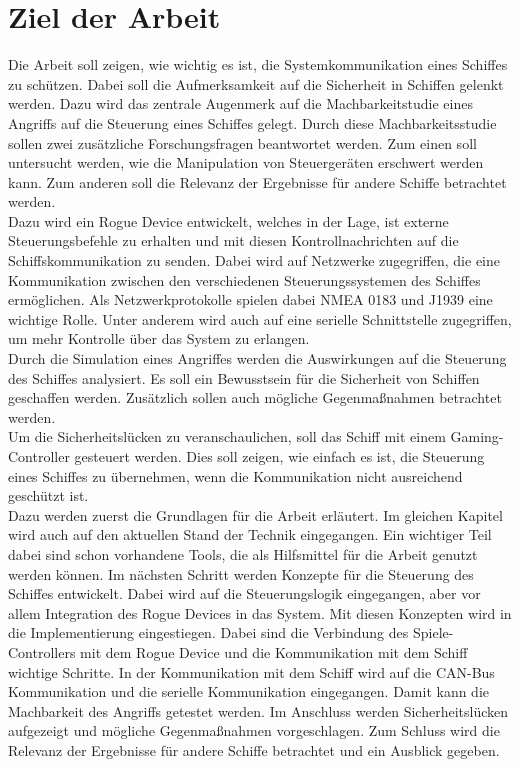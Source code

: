 \section{Ziel der Arbeit}
Die Arbeit soll zeigen, wie wichtig es ist, die Systemkommunikation eines Schiffes zu schützen.
Dabei soll die Aufmerksamkeit auf die Sicherheit in Schiffen gelenkt werden.
Dazu wird das zentrale Augenmerk auf die Machbarkeitstudie eines Angriffs auf die Steuerung eines Schiffes gelegt.
Durch diese Machbarkeitsstudie sollen zwei zusätzliche Forschungsfragen beantwortet werden.
Zum einen soll untersucht werden, wie die Manipulation von Steuergeräten erschwert werden kann.
Zum anderen soll die Relevanz der Ergebnisse für andere Schiffe betrachtet werden. \\
Dazu wird ein Rogue Device entwickelt, welches in der 
Lage, ist externe Steuerungsbefehle zu erhalten und mit diesen Kontrollnachrichten auf die Schiffskommunikation zu senden.
Dabei wird auf Netzwerke zugegriffen, die eine Kommunikation zwischen den verschiedenen Steuerungssystemen des Schiffes 
ermöglichen. Als Netzwerkprotokolle spielen dabei NMEA 0183 und J1939 eine wichtige Rolle. Unter anderem wird auch 
auf eine serielle Schnittstelle zugegriffen, um mehr Kontrolle über das System zu erlangen. \\
Durch die Simulation eines Angriffes werden die Auswirkungen auf die Steuerung des 
Schiffes analysiert. Es soll ein Bewusstsein für die Sicherheit von Schiffen geschaffen werden. Zusätzlich 
sollen auch mögliche Gegenmaßnahmen betrachtet werden. \\
Um die Sicherheitslücken zu veranschaulichen, soll das Schiff mit einem Gaming-Controller gesteuert werden.
Dies soll zeigen, wie einfach es ist, die Steuerung eines Schiffes zu übernehmen, wenn die Kommunikation nicht 
ausreichend geschützt ist.\\
Dazu werden zuerst die Grundlagen für die Arbeit erläutert. Im gleichen Kapitel wird auch auf den aktuellen Stand der Technik eingegangen.
Ein wichtiger Teil dabei sind schon vorhandene Tools, die als Hilfsmittel für die Arbeit genutzt werden können.
Im nächsten Schritt werden Konzepte für die Steuerung des Schiffes entwickelt. Dabei wird auf die Steuerungslogik eingegangen, aber
vor allem Integration des Rogue Devices in das System. Mit diesen Konzepten wird in die Implementierung eingestiegen. Dabei sind 
die Verbindung des Spiele-Controllers mit dem Rogue Device und die Kommunikation mit dem Schiff wichtige Schritte.
In der Kommunikation mit dem Schiff wird auf die CAN-Bus Kommunikation und die serielle Kommunikation eingegangen.
Damit kann die Machbarkeit des Angriffs getestet werden. Im Anschluss werden Sicherheitslücken aufgezeigt und mögliche Gegenmaßnahmen
vorgeschlagen. Zum Schluss wird die Relevanz der Ergebnisse für andere Schiffe betrachtet und ein Ausblick gegeben. \\
